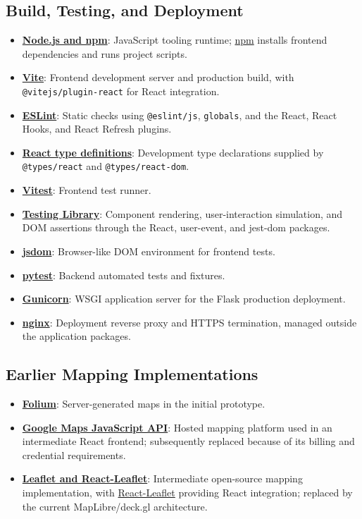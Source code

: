 \documentclass[12pt]{article}
\begin{document}
\subsection*{Build, Testing, and Deployment}
\begin{itemize}
    \item \href{https://nodejs.org/}{\textbf{Node.js and npm}}: JavaScript tooling runtime; \href{https://www.npmjs.com/}{npm} installs frontend dependencies and runs project scripts.
    \item \href{https://vite.dev/}{\textbf{Vite}}: Frontend development server and production build, with \texttt{@vitejs/plugin-react} for React integration.
    \item \href{https://eslint.org/}{\textbf{ESLint}}: Static checks using \texttt{@eslint/js}, \texttt{globals}, and the React, React Hooks, and React Refresh plugins.
    \item \href{https://github.com/DefinitelyTyped/DefinitelyTyped}{\textbf{React type definitions}}: Development type declarations supplied by \texttt{@types/react} and \texttt{@types/react-dom}.
    \item \href{https://vitest.dev/}{\textbf{Vitest}}: Frontend test runner.
    \item \href{https://testing-library.com/}{\textbf{Testing Library}}: Component rendering, user-interaction simulation, and DOM assertions through the React, user-event, and jest-dom packages.
    \item \href{https://github.com/jsdom/jsdom}{\textbf{jsdom}}: Browser-like DOM environment for frontend tests.
    \item \href{https://docs.pytest.org/}{\textbf{pytest}}: Backend automated tests and fixtures.
    \item \href{https://gunicorn.org/}{\textbf{Gunicorn}}: WSGI application server for the Flask production deployment.
    \item \href{https://nginx.org/}{\textbf{nginx}}: Deployment reverse proxy and HTTPS termination, managed outside the application packages.
\end{itemize}

\subsection*{Earlier Mapping Implementations}
\begin{itemize}
    \item \href{https://python-visualization.github.io/folium/latest/}{\textbf{Folium}}: Server-generated maps in the initial prototype.
    \item \href{https://developers.google.com/maps/documentation/javascript/overview}{\textbf{Google Maps JavaScript API}}: Hosted mapping platform used in an intermediate React frontend; subsequently replaced because of its billing and credential requirements.
    \item \href{https://leafletjs.com/}{\textbf{Leaflet and React-Leaflet}}: Intermediate open-source mapping implementation, with \href{https://react-leaflet.js.org/}{React-Leaflet} providing React integration; replaced by the current MapLibre/deck.gl architecture.
\end{itemize}

\clearpage
{}
{}


\end{document}
